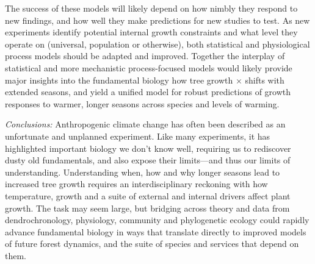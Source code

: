 \documentclass[11pt]{article}
\begin{document}
The success of these models will likely depend on how nimbly they respond to new findings, and how well they make predictions for new studies to test. As new experiments identify potential internal growth constraints and what level they operate on (universal, population or otherwise), both statistical and physiological process models should be adapted and improved. Together the interplay of statistical and more mechanistic process-focused models would likely provide major insights into the fundamental biology how tree growth $\times$ shifts with extended seasons, and yield a unified model for robust predictions of growth responses to warmer, longer seasons across species and levels of warming. 

\emph{Conclusions:} %
Anthropogenic climate change has often been described as an unfortunate and unplanned experiment. Like many experiments, it has highlighted important biology we don't know well, requiring us to rediscover dusty old fundamentals, and also expose their limits---and thus our limits of understanding. Understanding when, how and why longer seasons lead to increased tree growth requires an interdisciplinary reckoning with how temperature, growth and a suite of external and internal drivers affect plant growth. The task may seem large, but bridging across theory and data from dendrochronology, physiology, community and phylogenetic ecology could rapidly advance fundamental biology in ways that translate directly to improved models of future forest dynamics, and the suite of species and services that depend on them. %


\end{document}
